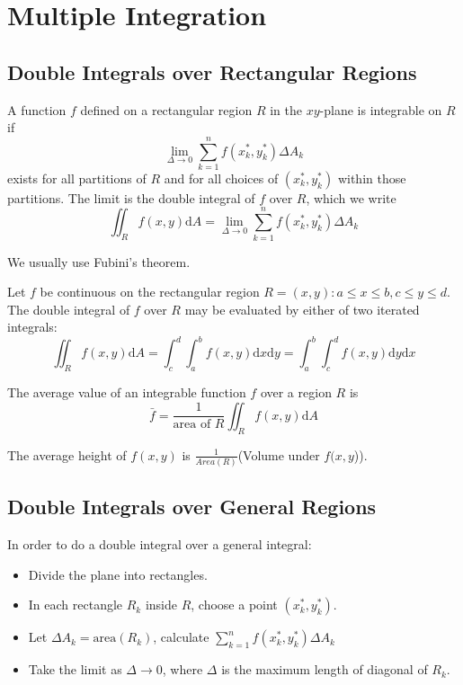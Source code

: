 \documentclass[../calc3.tex]{subfiles}
\begin{document}
\chapter{Multiple Integration}
\section{Double Integrals over Rectangular Regions}
\begin{definition}
    A function $f$ defined on a rectangular region $R$ in the $xy$-plane is integrable 
    on $R$ if \[\lim_{\Delta \to 0} \sum^n_{k=1}f\left(x_k^*,y_k^*\right)\Delta A_k\] exists for all partitions 
    of $R$ and for all choices of $\left(x_k^*,y_k^*\right)$ within those partitions.
    The limit is the double integral of $f$ over $R$, which we write
    \[\iint_R f(x,y)\mathrm{d}A=\lim_{\Delta \to 0}\sum_{k=1}^n f\left(x_k^*, y_k^*\right)\Delta A_k\]
\end{definition}

We usually use Fubini's theorem.
\begin{theorem}
    Let $f$ be continuous on the rectangular region $R={(x,y): a\leq x\leq b, c\leq y\leq d}$.
    The double integral of $f$ over $R$ may be evaluated by either of two iterated integrals:
    \[\iint_R f(x,y)\mathrm{d}A=\int_c^d\int_a^b f(x,y)\mathrm{d}x\mathrm{d}y=\int_a^b\int_c^d f(x,y)\mathrm{d}y\mathrm{d}x\]
\end{theorem}

\begin{definition}
    The average value of an integrable function $f$ over a region $R$ is
    \[\bar{f}=\frac{1}{\text{area of } R}\iint_R f(x,y)\mathrm{d}A\]
\end{definition}

The average height of $f(x,y)$ is $\frac{1}{Area(R)}$(Volume under $f(x,y$)).
\section{Double Integrals over General Regions}
In order to do a double integral over a general integral:
\begin{itemize}
    \item Divide the plane into rectangles.
    \item In each rectangle $R_k$ inside $R$, choose a point $(x_k^*, y_k^*)$.
    \item Let $\Delta A_k = \text{area}(R_k)$, calculate $\sum_{k=1}^n f(x_k^*,y_k^*)\Delta A_k$
    \item Take the limit as $\Delta \rightarrow 0$, where $\Delta$ is the maximum length of diagonal of $R_k$.
\end{itemize}
\end{document}
